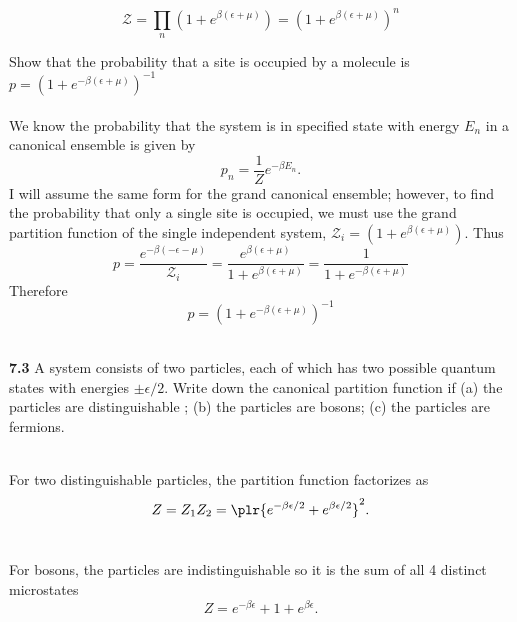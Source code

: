 \documentclass[11pt,letterpaper]{article}
\begin{document}
	\[
		\mathcal Z = \prod_n (1+e^{\beta( \epsilon+\mu)}) = (1+e^{\beta( \epsilon+\mu)})^n
	\]
	\item
	Show that the probability that a site is occupied by a molecule is $p = (1+e^{-\beta(\epsilon+\mu)})^{-1}$
	\\
	\\
	We know the probability that the system is in specified state with energy $E_n$ in a canonical
	ensemble is given by
	\[
		p_n = \frac{1}{Z}e^{-\beta E_n}.
	\]
	I will assume the same form for the grand canonical ensemble; however, to find the probability that 
	only a single site is occupied, we must use the grand partition function 
	of the single independent system, $\mathcal Z_i = (1+e^{\beta(\epsilon+\mu)})$.  
	Thus
	\[
		p = \frac{e^{-\beta(-\epsilon-\mu)}}{\mathcal Z_i} 
		= \frac{e^{\beta(\epsilon+\mu)}}{1+e^{\beta(\epsilon+\mu)}} = \frac{1}{1+e^{-\beta(\epsilon+\mu)}}
	\]
	Therefore
	\[
		p = (1+e^{-\beta(\epsilon+\mu)})^{-1}
	\]
	\\
	
	\eenum
	\item[\textbf{7.3}]
	A system consists of two particles, each of which has two possible quantum states with energies
	$\pm \epsilon/2$. Write down the canonical partition function if (a) the particles are distinguishable
	; (b) the particles are bosons; (c) the particles are fermions.
	\\
	\\
	\benum
	\item
	For two distinguishable particles, the partition function factorizes as
	\[
		Z = Z_1Z_2 = \plr{e^{-\beta \epsilon/2}+e^{\beta \epsilon/2}}^2. 
	\] \\
	
	\item
	For bosons, the particles are indistinguishable so it is the sum of all 4 distinct microstates
	\[
		Z = e^{-\beta\epsilon}+1+e^{\beta\epsilon}.
	\]\\
	
\end{document}
